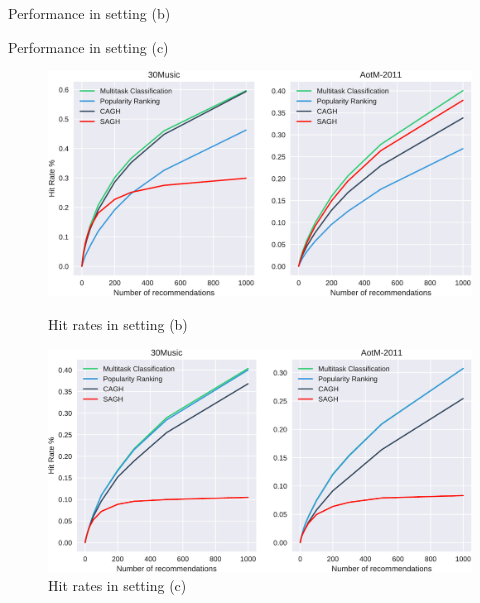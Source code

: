 \begin{table}[!t]
    \centering
    \begin{minipage}{.5\textwidth}
        \centering
        \caption{Performance in setting (b)}
        \label{tab:perf1}
        \resizebox{.95\textwidth}{!}{
        
        }
    \end{minipage}%
    \begin{minipage}{0.5\textwidth}
        \centering
        \caption{Performance in setting (c)}
        \label{tab:perf2}
        \resizebox{.95\textwidth}{!}{
        
        }
    \end{minipage}
\end{table}


\begin{figure}[t]
    \centering
    \begin{minipage}{.5\textwidth}
        \centering
        \includegraphics[width=.925\linewidth]{fig/hitrate1.pdf}
        \caption{Hit rates in setting (b)}
        \label{fig:hr1}
    \end{minipage}%
    \begin{minipage}{0.5\textwidth}
        \centering
        \includegraphics[width=.925\linewidth]{fig/hitrate2.pdf}
        \caption{Hit rates in setting (c)}
        \label{fig:hr2}
    \end{minipage}
\end{figure}



